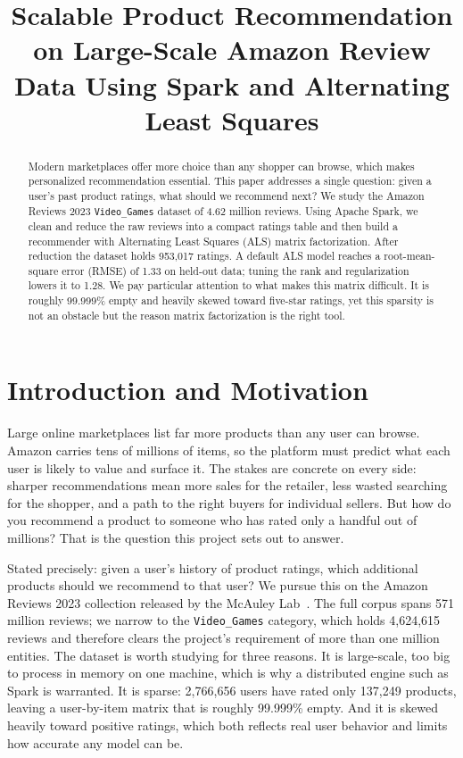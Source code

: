 \documentclass[conference]{IEEEtran}
\begin{document}
\title{Scalable Product Recommendation on Large-Scale Amazon Review Data
Using Spark and Alternating Least Squares}

\author{
}

\maketitle

\begin{abstract}
Modern marketplaces offer more choice than any shopper can browse, which makes
personalized recommendation essential. This paper addresses a single question: given a
user's past product ratings, what should we recommend next? We study the Amazon Reviews
2023 \texttt{Video\_Games} dataset of 4.62 million reviews. Using Apache Spark, we clean
and reduce the raw reviews into a compact ratings table and then build a recommender with
Alternating Least Squares (ALS) matrix factorization. After reduction the dataset holds
953,017 ratings. A default ALS model reaches a root-mean-square error (RMSE) of 1.33 on
held-out data; tuning the rank and regularization lowers it to 1.28. We pay particular
attention to what makes this matrix difficult. It is roughly 99.999\% empty and heavily
skewed toward five-star ratings, yet this sparsity is not an obstacle but the
reason matrix factorization is the right tool.
\end{abstract}

\section{Introduction and Motivation}
Large online marketplaces list far more products than any user can browse. Amazon carries
tens of millions of items, so the platform must predict what each user is likely to value
and surface it. The stakes are concrete on every side: sharper recommendations mean more
sales for the retailer, less wasted searching for the shopper, and a path to the right
buyers for individual sellers. But how do you recommend a product to someone who has rated
only a handful out of millions? That is the question this project sets out to answer.

Stated precisely: given a user's history of product ratings, which additional products
should we recommend to that user? We pursue this on the Amazon Reviews 2023 collection
released by the McAuley Lab~\cite{amazon2023}. The full corpus spans 571 million reviews;
we narrow to the \texttt{Video\_Games} category, which holds 4{,}624{,}615 reviews and
therefore clears the project's requirement of more than one million entities. The dataset
is worth studying for three reasons. It is large-scale, too big to process in memory on one
machine, which is why a distributed engine such as Spark is warranted. It is sparse:
2{,}766{,}656 users have rated only 137{,}249 products, leaving a user-by-item matrix that
is roughly 99.999\% empty. And it is skewed heavily toward positive ratings, which both
reflects real user behavior and limits how accurate any model can be.
\end{document}
